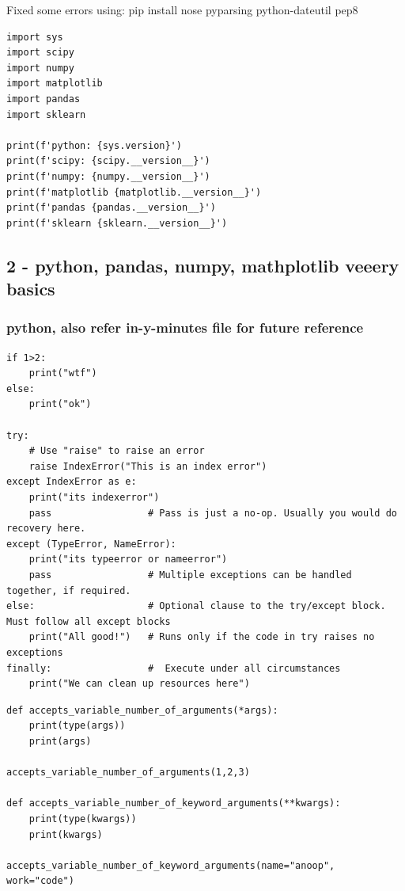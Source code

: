 \documentclass[11pt]{article}
\begin{document}
Fixed some errors using: pip install nose pyparsing python-dateutil pep8
\begin{verbatim}
import sys
import scipy
import numpy
import matplotlib
import pandas
import sklearn

print(f'python: {sys.version}')
print(f'scipy: {scipy.__version__}')
print(f'numpy: {numpy.__version__}')
print(f'matplotlib {matplotlib.__version__}')
print(f'pandas {pandas.__version__}')
print(f'sklearn {sklearn.__version__}')

\end{verbatim}

\subsection{2 - python, pandas, numpy, mathplotlib veeery basics}
\label{sec:org8bc6077}

\subsubsection{python, also refer in-y-minutes file for future reference}
\label{sec:org53fa719}
\begin{verbatim}
if 1>2:
    print("wtf")
else:
    print("ok")

try:
    # Use "raise" to raise an error
    raise IndexError("This is an index error")
except IndexError as e:
    print("its indexerror")
    pass                 # Pass is just a no-op. Usually you would do recovery here.
except (TypeError, NameError):
    print("its typeerror or nameerror")
    pass                 # Multiple exceptions can be handled together, if required.
else:                    # Optional clause to the try/except block. Must follow all except blocks
    print("All good!")   # Runs only if the code in try raises no exceptions
finally:                 #  Execute under all circumstances
    print("We can clean up resources here")
\end{verbatim}

\begin{verbatim}
def accepts_variable_number_of_arguments(*args):
    print(type(args))
    print(args)

accepts_variable_number_of_arguments(1,2,3)

def accepts_variable_number_of_keyword_arguments(**kwargs):
    print(type(kwargs))
    print(kwargs)

accepts_variable_number_of_keyword_arguments(name="anoop", work="code")
\end{verbatim}
\end{document}
